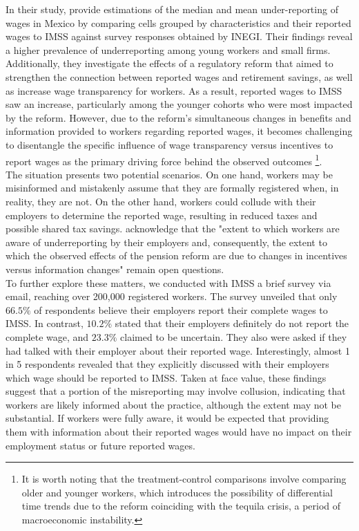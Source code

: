 \documentclass[10pt, oneside]{book}
\begin{document}
In their study, \cite{kumler2020enlisting} provide estimations of the median and mean under-reporting of wages in Mexico by comparing cells grouped by characteristics and their reported wages to IMSS against survey responses obtained by INEGI. Their findings reveal a higher prevalence of underreporting among young workers and small firms. Additionally, they investigate the effects of a regulatory reform that aimed to strengthen the connection between reported wages and retirement savings, as well as increase wage transparency for workers. As a result, reported wages to IMSS saw an increase, particularly among the younger cohorts who were most impacted by the reform. However, due to the reform's simultaneous changes in benefits and information provided to workers regarding reported wages, it becomes challenging to disentangle the specific influence of wage transparency versus incentives to report wages as the primary driving force behind the observed outcomes \footnote{It is worth noting that the treatment-control comparisons involve comparing older and younger workers, which introduces the possibility of differential time trends due to the reform coinciding with the tequila crisis, a period of macroeconomic instability.}. \\

The situation presents two potential scenarios. On one hand, workers may be misinformed and mistakenly assume that they are formally registered when, in reality, they are not. On the other hand, workers could collude with their employers to determine the reported wage, resulting in reduced taxes and possible shared tax savings. \cite{kumler2020enlisting} acknowledge that the "extent to which workers are aware of underreporting by their employers and, consequently, the extent to which the observed effects of the pension reform are due to changes in incentives versus information changes" remain open questions. \\

To further explore these matters, we conducted with IMSS a brief survey via email, reaching over 200,000 registered workers. The survey unveiled that only $66.5\%$ of respondents believe their employers report their complete wages to IMSS. In contrast, $10.2\%$ stated that their employers definitely do not report the complete wage, and $23.3\%$ claimed to be uncertain. They also were asked if they had talked with their employer about their reported wage. Interestingly, almost 1 in 5 respondents revealed that they explicitly discussed with their employers which wage should be reported to IMSS. Taken at face value, these findings suggest that a portion of the misreporting may involve collusion, indicating that workers are likely informed about the practice, although the extent may not be substantial. If workers were fully aware, it would be expected that providing them with information about their reported wages would have no impact on their employment status or future reported wages. \\
\end{document}
